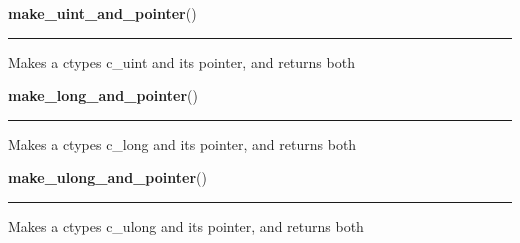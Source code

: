     \label{xformslib:library:make_uint_and_pointer}

    \vspace{0.5ex}

\hspace{.8\funcindent}\begin{boxedminipage}{\funcwidth}

    \raggedright \textbf{make\_uint\_and\_pointer}()

    \vspace{-1.5ex}

    \rule{\textwidth}{0.5\fboxrule}
\setlength{\parskip}{2ex}
    Makes a ctypes c\_uint and its pointer, and returns both

\setlength{\parskip}{1ex}
    \end{boxedminipage}

    \label{xformslib:library:make_long_and_pointer}

    \vspace{0.5ex}

\hspace{.8\funcindent}\begin{boxedminipage}{\funcwidth}

    \raggedright \textbf{make\_long\_and\_pointer}()

    \vspace{-1.5ex}

    \rule{\textwidth}{0.5\fboxrule}
\setlength{\parskip}{2ex}
    Makes a ctypes c\_long and its pointer, and returns both

\setlength{\parskip}{1ex}
    \end{boxedminipage}

    \label{xformslib:library:make_ulong_and_pointer}

    \vspace{0.5ex}

\hspace{.8\funcindent}\begin{boxedminipage}{\funcwidth}

    \raggedright \textbf{make\_ulong\_and\_pointer}()

    \vspace{-1.5ex}

    \rule{\textwidth}{0.5\fboxrule}
\setlength{\parskip}{2ex}
    Makes a ctypes c\_ulong and its pointer, and returns both

\setlength{\parskip}{1ex}
    \end{boxedminipage}


